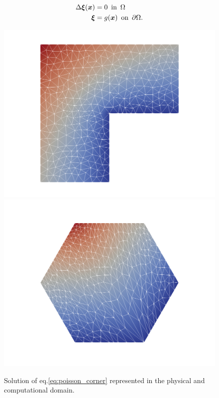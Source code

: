 \documentclass[a4paper,11pt]{article}
\begin{document}
{\begin{equation}
\label{eq:map_domain}
\begin{split}
    \Delta \boldsymbol \xi(\boldsymbol x) &= 0 \, \text{ in } \, \Omega \\
    \boldsymbol \xi &= g(\boldsymbol x) \, \text{ on } \, \partial \Omega.
\end{split}
\end{equation}

\begin{figure}[h!]\label{fig:mesh_Winslow}
    \centering
    \includegraphics[scale=0.2]{Images/Test1/r-adaptive/u.png}
    \includegraphics[scale=0.2]{Images/Test1/r-adaptive/u_c.png}
    \caption{Solution of eq.\eqref{eq:poisson_corner} represented in the physical and computational domain.}
    \label{fig:initial_mesh}
\end{figure}

}
\end{document}
